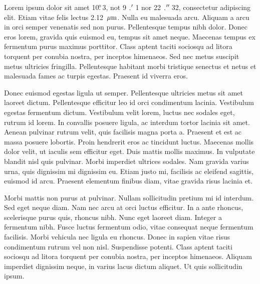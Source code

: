 \documentclass{lowell-prop}
\begin{document}
%


\scienceJustification


Lorem ipsum dolor sit amet 10$\mbox{$.\!\!^\circ$}$3, not 9$\farcm$1 nor 22$\farcs$32, consectetur adipiscing elit. Etiam vitae felis lectus 2.12~$\mbox{$\mu$m}$. Nulla eu malesuada arcu. Aliquam a arcu in orci semper venenatis sed non purus. Pellentesque tempus nibh dolor. Donec eros lorem, gravida quis euismod eu, tempus sit amet neque. Maecenas tempus ex fermentum purus maximus porttitor. Class aptent taciti sociosqu ad litora torquent per conubia nostra, per inceptos himenaeos. Sed nec metus suscipit metus ultricies fringilla. Pellentesque habitant morbi tristique senectus et netus et malesuada fames ac turpis egestas. Praesent id viverra eros.

Donec euismod egestas ligula ut semper. Pellentesque ultricies metus sit amet laoreet dictum. Pellentesque efficitur leo id orci condimentum lacinia. Vestibulum egestas fermentum dictum. Vestibulum velit lorem, luctus nec sodales eget, rutrum id lorem. In convallis posuere ligula, ac interdum tortor lacinia sit amet. Aenean pulvinar rutrum velit, quis facilisis magna porta a. Praesent et est ac massa posuere lobortis. Proin hendrerit eros ac tincidunt luctus. Maecenas mollis dolor velit, ut iaculis sem efficitur eget. Duis mattis mollis maximus. In vulputate blandit nisl quis pulvinar. Morbi imperdiet ultrices sodales. Nam gravida varius urna, quis dignissim mi dignissim eu. Etiam justo mi, facilisis ac eleifend sagittis, euismod id arcu. Praesent elementum finibus diam, vitae gravida risus lacinia et.

Morbi mattis non purus at pulvinar. Nullam sollicitudin pretium mi id interdum. Sed eget neque diam. Nam nec arcu at orci luctus efficitur. In a ante rhoncus, scelerisque purus quis, rhoncus nibh. Nunc eget laoreet diam. Integer a fermentum nibh. Fusce luctus fermentum odio, vitae consequat neque fermentum facilisis. Morbi vehicula nec ligula eu rhoncus. Donec in sapien vitae risus condimentum rutrum vel non nisl. Suspendisse potenti. Class aptent taciti sociosqu ad litora torquent per conubia nostra, per inceptos himenaeos. Aliquam imperdiet dignissim neque, in varius lacus dictum aliquet. Ut quis sollicitudin ipsum.
\end{document}
